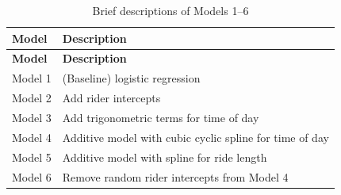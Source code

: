 \documentclass[]{article}
\begin{document}
\begin{longtable}[]{@{}ll@{}}
\caption{Brief descriptions of Models 1--6
\label{tab:models}}\tabularnewline
\toprule
\begin{minipage}[b]{0.13\columnwidth}\raggedright\strut
\textbf{Model}
\strut\end{minipage} &
\begin{minipage}[b]{0.72\columnwidth}\raggedright\strut
\textbf{Description}
\strut\end{minipage}\tabularnewline
\midrule
\endfirsthead
\toprule
\begin{minipage}[b]{0.13\columnwidth}\raggedright\strut
\textbf{Model}
\strut\end{minipage} &
\begin{minipage}[b]{0.72\columnwidth}\raggedright\strut
\textbf{Description}
\strut\end{minipage}\tabularnewline
\midrule
\endhead
\begin{minipage}[t]{0.13\columnwidth}\raggedright\strut
Model 1
\strut\end{minipage} &
\begin{minipage}[t]{0.72\columnwidth}\raggedright\strut
(Baseline) logistic regression
\strut\end{minipage}\tabularnewline
\begin{minipage}[t]{0.13\columnwidth}\raggedright\strut
Model 2
\strut\end{minipage} &
\begin{minipage}[t]{0.72\columnwidth}\raggedright\strut
Add rider intercepts
\strut\end{minipage}\tabularnewline
\begin{minipage}[t]{0.13\columnwidth}\raggedright\strut
Model 3
\strut\end{minipage} &
\begin{minipage}[t]{0.72\columnwidth}\raggedright\strut
Add trigonometric terms for time of day
\strut\end{minipage}\tabularnewline
\begin{minipage}[t]{0.13\columnwidth}\raggedright\strut
Model 4
\strut\end{minipage} &
\begin{minipage}[t]{0.72\columnwidth}\raggedright\strut
Additive model with cubic cyclic spline for time of day
\strut\end{minipage}\tabularnewline
\begin{minipage}[t]{0.13\columnwidth}\raggedright\strut
Model 5
\strut\end{minipage} &
\begin{minipage}[t]{0.72\columnwidth}\raggedright\strut
Additive model with spline for ride length
\strut\end{minipage}\tabularnewline
\begin{minipage}[t]{0.13\columnwidth}\raggedright\strut
Model 6
\strut\end{minipage} &
\begin{minipage}[t]{0.72\columnwidth}\raggedright\strut
Remove random rider intercepts from Model 4
\strut\end{minipage}\tabularnewline
\bottomrule
\end{longtable}
\end{document}
